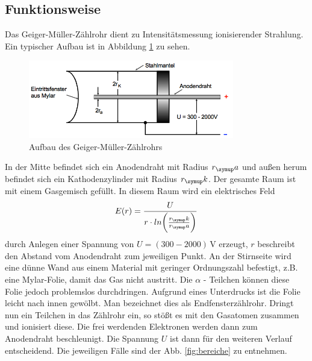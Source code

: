 \subsection{Funktionsweise}
Das Geiger-Müller-Zählrohr dient zu Intensitätsmessung ionisierender Strahlung.
Ein typischer Aufbau ist in Abbildung \ref{fig:aufbau} zu sehen.
\begin{figure}
  \centering
  \includegraphics[width=0.8\textwidth]{bilder/aufbau.png}
  \caption{Aufbau des Geiger-Müller-Zählrohrs \cite{703.}
  \label{fig:aufbau}}
\end{figure}
In der Mitte befindet sich ein Anodendraht mit Radius $r_\su{a}$ und außen herum
befindet sich ein Kathodenzylinder mit Radius $r_\su{k}$. Der gesamte Raum ist mit
einem Gasgemisch gefüllt. In diesem Raum wird ein elektrisches Feld
\begin{equation}
  E(r)= \frac{U}{r \cdot ln \bigg( \frac{r_\su{k}}{r_\su{a}}\bigg)}
\end{equation}
durch Anlegen einer Spannung von $U = (300-2000) \,\si{\volt}$ erzeugt, $r$
beschreibt den Abstand vom Anodendraht zum jeweiligen Punkt.
An der Stirnseite wird eine dünne Wand aus einem Material mit geringer Ordnungszahl
befestigt, z.B. eine Mylar-Folie, damit das Gas nicht austritt. Die $\alpha$ - Teilchen
können diese Folie jedoch problemslos durchdringen. Aufgrund eines Unterdrucks ist
die Folie leicht nach innen gewölbt. Man bezeichnet dies als Endfensterzählrohr.
Dringt nun ein Teilchen in das Zählrohr ein, so stößt es mit den Gasatomen zusammen
und ionisiert diese. Die frei werdenden Elektronen werden dann zum Anodendraht
beschleunigt. Die Spannung $U$ ist dann für den weiteren Verlauf entscheidend.
Die jeweiligen Fälle sind der Abb. \ref{fig:bereiche}
zu entnehmen.
